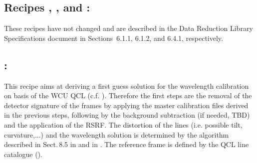 \subsection{Recipes , , and :}
These recipes have not changed and are described in the Data Reduction Library Specifications document \cite{DRLS} in Sections~6.1.1, 6.1.2, and 6.4.1, respectively.

\subsection{:}
This recipe aims at deriving a first guess solution for the wavelength calibration on basis of the \ac{WCU} \ac{QCL} (c.f. \cite{METIS-calibration_plan}). Therefore the first steps are the removal of the detector signature of the  frames by applying the master calibration files derived in the previous steps, following by the background subtraction (if needed, TBD) and the application of the RSRF. The distortion of the lines (i.e. possible tilt, curvature,...) and the wavelength solution is determined by the algorithm described in Sect.\,8.5 in \cite{DRLS} and in \cite{METIS-calibration_plan}. The reference frame is defined by the \ac{QCL} line catalogue ().

